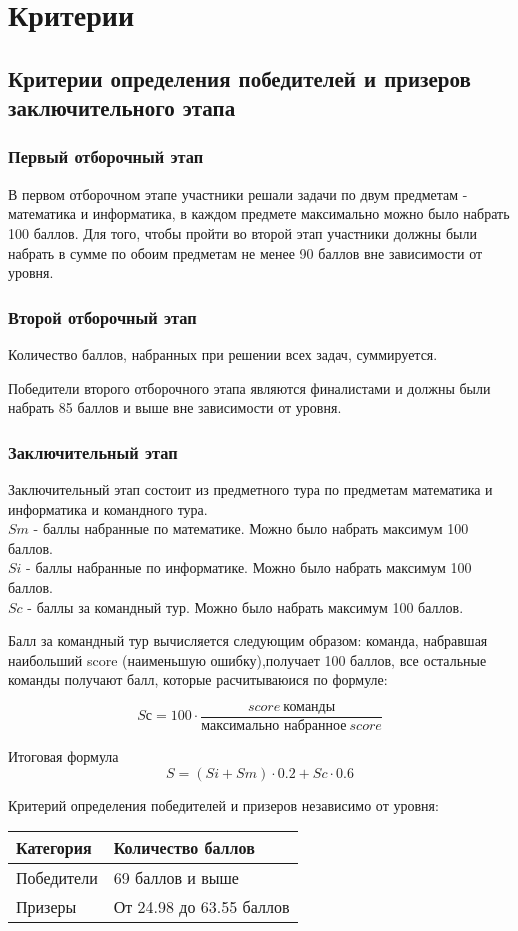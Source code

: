 \part{Критерии}

\chapter{Критерии определения победителей и призеров заключительного этапа}

\section{Первый отборочный этап}
 
В первом отборочном этапе участники решали задачи по двум предметам - математика и информатика, в каждом предмете максимально можно было набрать 100 баллов. Для того, чтобы пройти во второй этап участники должны были набрать в сумме по обоим предметам не менее 90 баллов вне зависимости от уровня.

\section{Второй отборочный этап}

Количество баллов, набранных при решении всех задач, суммируется. 

Победители второго отборочного этапа являются финалистами и должны были набрать 85 баллов и выше вне зависимости от уровня.

\section{Заключительный этап}

Заключительный этап состоит из предметного тура по предметам математика и информатика и командного тура.\\
$Sm$ - баллы набранные по математике. Можно было набрать максимум 100 баллов.\\
$Si$ - баллы набранные по информатике. Можно было набрать максимум 100 баллов.\\
$Sc$ - баллы за командный тур. Можно было набрать максимум 100 баллов.

Балл за командный тур вычисляется следующим образом: команда, набравшая наибольший score (наименьшую ошибку),получает 100 баллов, все остальные команды получают балл, которые расчитываюися по формуле:

$$Sс = 100 \cdot \frac{score \: \text{команды}}{\text{максимально набранное} \: score}$$
 
Итоговая формула $$S = (Si + Sm) \cdot 0.2 + Sc \cdot 0.6$$

Критерий определения победителей и призеров независимо от уровня:
\begin{center}
    \begin{tabular}{|l|l|}
        \hline
        Категория&Количество баллов\\
        \hline
        Победители&69 баллов и выше\\
        \hline
        Призеры&От 24.98 до 63.55 баллов\\
        \hline
    \end{tabular}
\end{center}